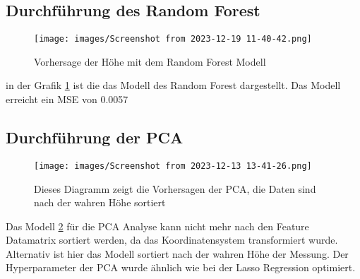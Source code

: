 \subsection{Durchführung des Random Forest}
\begin{figure} 
   
  \texttt{[image: images/Screenshot from 2023-12-19 11-40-42.png]}
  \caption{Vorhersage der Höhe mit dem Random Forest Modell}
  \label{fig:Rand}
\end{figure}
in der Grafik \ref{fig:Rand} ist die das Modell des Random Forest dargestellt. Das Modell erreicht ein MSE von 0.0057

\subsection{Durchführung der PCA}
\begin{figure} 
   
  \texttt{[image: images/Screenshot from 2023-12-13 13-41-26.png]}
  \caption{Dieses Diagramm zeigt die Vorhersagen der PCA, die Daten sind nach der wahren Höhe sortiert}
  \label{fig:PCAI}
\end{figure}
Das Modell \ref{fig:PCAI} für die PCA Analyse kann nicht mehr nach den Feature Datamatrix sortiert werden, da das Koordinatensystem transformiert wurde. Alternativ ist hier das Modell sortiert nach der wahren Höhe der Messung. Der Hyperparameter der PCA wurde ähnlich wie bei der Lasso Regression optimiert.


